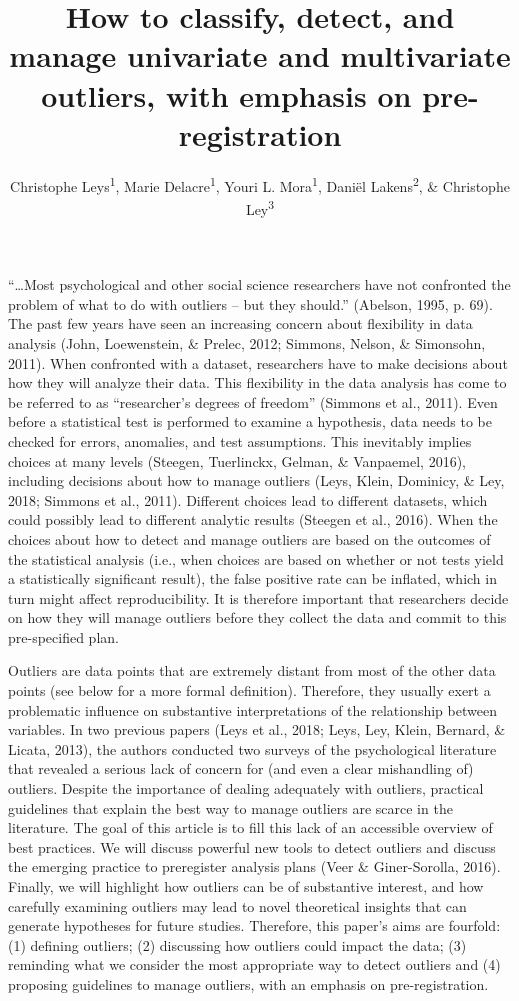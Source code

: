 \documentclass[man,floatsintext]{apa6}
\title{How to classify, detect, and manage univariate and multivariate outliers, with emphasis on pre-registration}
\author{Christophe Leys\textsuperscript{1}, Marie Delacre\textsuperscript{1}, Youri L. Mora\textsuperscript{1}, Daniël Lakens\textsuperscript{2}, \& Christophe Ley\textsuperscript{3}}
\date{}
\affiliation{
\vspace{0.5cm}
\textsuperscript{1} Université Libre de Bruxelles, Service of Analysis of the Data (SAD), Bruxelles, Belgium\\\textsuperscript{2} Eindhoven University of Technology, Human Technology Interaction Group, Eindhoven, the Netherlands\\\textsuperscript{3} Universiteit Gent, Department of Applied Mathematics, Computer Science and Statistics, Gent, Belgium}
\begin{document}
\maketitle

\enquote{\ldots{}Most psychological and other social science researchers have not confronted the problem of what to do with outliers -- but they should.} (Abelson, 1995, p. 69). The past few years have seen an increasing concern about flexibility in data analysis (John, Loewenstein, \& Prelec, 2012; Simmons, Nelson, \& Simonsohn, 2011). When confronted with a dataset, researchers have to make decisions about how they will analyze their data. This flexibility in the data analysis has come to be referred to as \enquote{researcher's degrees of freedom} (Simmons et al., 2011). Even before a statistical test is performed to examine a hypothesis, data needs to be checked for errors, anomalies, and test assumptions. This inevitably implies choices at many levels (Steegen, Tuerlinckx, Gelman, \& Vanpaemel, 2016), including decisions about how to manage outliers (Leys, Klein, Dominicy, \& Ley, 2018; Simmons et al., 2011). Different choices lead to different datasets, which could possibly lead to different analytic results (Steegen et al., 2016). When the choices about how to detect and manage outliers are based on the outcomes of the statistical analysis (i.e., when choices are based on whether or not tests yield a statistically significant result), the false positive rate can be inflated, which in turn might affect reproducibility. It is therefore important that researchers decide on how they will manage outliers before they collect the data and commit to this pre-specified plan.

Outliers are data points that are extremely distant from most of the other data points (see below for a more formal definition). Therefore, they usually exert a problematic influence on substantive interpretations of the relationship between variables. In two previous papers (Leys et al., 2018; Leys, Ley, Klein, Bernard, \& Licata, 2013), the authors conducted two surveys of the psychological literature that revealed a serious lack of concern for (and even a clear mishandling of) outliers. Despite the importance of dealing adequately with outliers, practical guidelines that explain the best way to manage outliers are scarce in the literature. The goal of this article is to fill this lack of an accessible overview of best practices. We will discuss powerful new tools to detect outliers and discuss the emerging practice to preregister analysis plans (Veer \& Giner-Sorolla, 2016). Finally, we will highlight how outliers can be of substantive interest, and how carefully examining outliers may lead to novel theoretical insights that can generate hypotheses for future studies. Therefore, this paper's aims are fourfold: (1) defining outliers; (2) discussing how outliers could impact the data; (3) reminding what we consider the most appropriate way to detect outliers and (4) proposing guidelines to manage outliers, with an emphasis on pre-registration.
\end{document}
